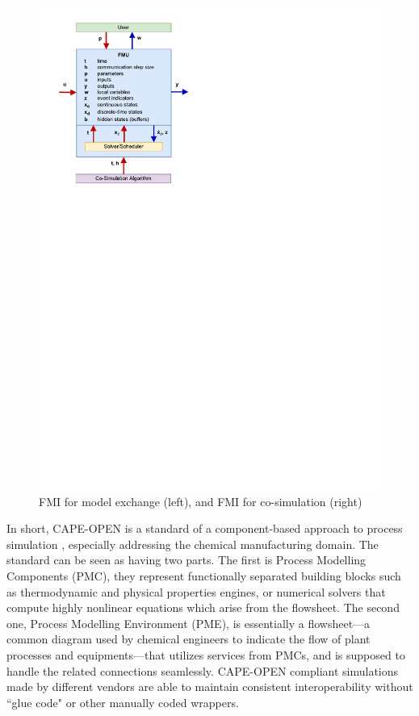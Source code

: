 \begin{figure}[hbt!]
   	\includegraphics[scale=0.6]{figures/fmi_cs.pdf}
    \caption[FMI for model exchange (left), and FMI for co-simulation (right)] {FMI for model exchange (left), and FMI for co-simulation (right) \cite{fmidoc}}
    \label{fig:fmi}
\end{figure}

In short, CAPE-OPEN is a standard of a component-based approach to process simulation \cite{Belaud2002}, especially addressing the chemical manufacturing domain. The standard can be seen as having two parts. The first is Process Modelling Components (PMC), they represent functionally separated building blocks such as thermodynamic and physical properties engines, or numerical solvers that compute highly nonlinear equations which arise from the flowsheet. The second one, Process Modelling Environment (PME), is essentially a flowsheet---a common diagram used by chemical engineers to indicate the flow of plant processes and equipments---that utilizes services from PMCs, and is supposed to handle the related connections seamlessly. CAPE-OPEN compliant simulations made by different vendors are able to maintain consistent interoperability without ``glue code" or other manually coded wrappers. 

